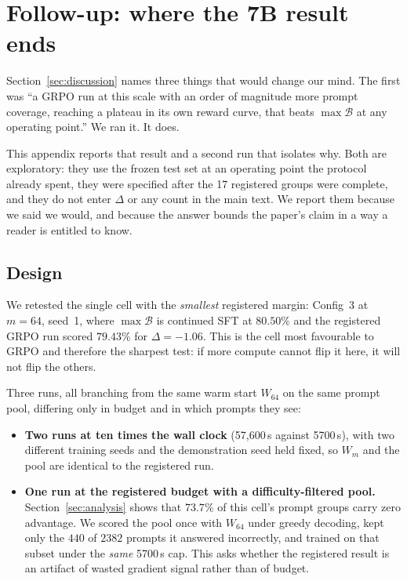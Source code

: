 \section{Follow-up: where the 7B result ends}
\label{app:followup}

Section~\ref{sec:discussion} names three things that would change our mind. The
first was ``a GRPO run at this scale with an order of magnitude more prompt
coverage, reaching a plateau in its own reward curve, that beats
$\max\mathcal{B}$ at any operating point.'' We ran it. It does.

This appendix reports that result and a second run that isolates why. Both are
exploratory: they use the frozen test set at an operating point the protocol
already spent, they were specified after the 17 registered groups were complete,
and they do not enter $\Delta$ or any count in the main text. We report them
because we said we would, and because the answer bounds the paper's claim in a
way a reader is entitled to know.

\subsection{Design}

We retested the single cell with the \emph{smallest} registered margin:
Config~3 at $m{=}64$, seed~1, where $\max\mathcal{B}$ is continued SFT at
$80.50\%$ and the registered GRPO run scored $79.43\%$ for $\Delta = -1.06$.
This is the cell most favourable to GRPO and therefore the sharpest test: if
more compute cannot flip it here, it will not flip the others.

Three runs, all branching from the same warm start $W_{64}$ on the same prompt
pool, differing only in budget and in which prompts they see:

\begin{itemize}
\item \textbf{Two runs at ten times the wall clock} (57{,}600\,s against
5700\,s), with two different training seeds and the demonstration seed held
fixed, so $W_m$ and the pool are identical to the registered run.
\item \textbf{One run at the registered budget with a difficulty-filtered
pool.} Section~\ref{sec:analysis} shows that $73.7\%$ of this cell's prompt
groups carry zero advantage. We scored the pool once with $W_{64}$ under greedy
decoding, kept only the $440$ of $2382$ prompts it answered incorrectly, and
trained on that subset under the \emph{same} 5700\,s cap. This asks whether the
registered result is an artifact of wasted gradient signal rather than of
budget.
\end{itemize}


